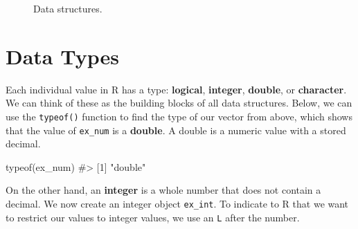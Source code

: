 \documentclass[
  letterpaper,
]{krantz}
\makeatletter
\newenvironment{Shaded}{\begin{snugshade}}{\end{snugshade}}
\newcommand{\CommentTok}[1]{\textcolor[rgb]{0.37,0.37,0.37}{#1}}
\newcommand{\FunctionTok}[1]{\textcolor[rgb]{0.28,0.35,0.67}{#1}}
\newcommand{\NormalTok}[1]{\textcolor[rgb]{0.00,0.23,0.31}{#1}}
\newenvironment{kframe}{%
\medskip{}
\setlength{\fboxsep}{.8em}
 \def\at@end@of@kframe{}%
 \ifinner\ifhmode%
  \def\at@end@of@kframe{\end{minipage}}%
  \begin{minipage}{\columnwidth}%
 \fi\fi%
 \def\FrameCommand##1{\hskip\@totalleftmargin \hskip-\fboxsep
 \colorbox{shadecolor}{##1}\hskip-\fboxsep
     \hskip-\linewidth \hskip-\@totalleftmargin \hskip\columnwidth}%
 \MakeFramed {\advance\hsize-\width
   \@totalleftmargin\z@ \linewidth\hsize
   \@setminipage}}%
 {\par\unskip\endMakeFramed%
 \at@end@of@kframe}
\renewenvironment{Shaded}{\begin{kframe}}{\end{kframe}}
\makeatother
\begin{document}
\begin{figure}


\caption{\label{fig-data-structures}Data structures.}

\end{figure}%

\section{Data Types}\label{data-types}

Each individual value in R has a type: \textbf{logical},
\textbf{integer}, \textbf{double}, or \textbf{character}. We can think
of these as the building blocks of all data structures. Below, we can
use the \texttt{typeof()} function to find the type of our vector from
above, which shows that the value of \texttt{ex\_num} is a
\textbf{double}. A double is a numeric value with a stored decimal.

\begin{Shaded}
\begin{Highlighting}[]
\FunctionTok{typeof}\NormalTok{(ex\_num)}
\CommentTok{\#\textgreater{} [1] "double"}
\end{Highlighting}
\end{Shaded}

On the other hand, an \textbf{integer} is a whole number that does not
contain a decimal. We now create an integer object \texttt{ex\_int}. To
indicate to R that we want to restrict our values to integer values, we
use an \texttt{L} after the number.
\end{document}
